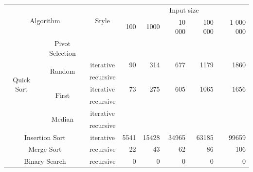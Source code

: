 \documentclass{article}
\begin{document}
\begin{table}[]
\begin{tabular}{|cc|c|rrrrr|}
\hline
\multicolumn{2}{|c|}{\multirow{2}{*}{Algorithm}} &
  \multirow{2}{*}{Style} &
  \multicolumn{5}{c|}{Input size} \\ \cline{4-8} 
\multicolumn{2}{|c|}{} &
   &
  \multicolumn{1}{r|}{100} &
  \multicolumn{1}{r|}{1000} &
  \multicolumn{1}{r|}{10 000} &
  \multicolumn{1}{r|}{100 000} &
  1 000 000 \\ \hline
\multicolumn{1}{|c|}{\multirow{7}{*}{Quick Sort}} &
  Pivot Selection &
   &
  \multicolumn{5}{r|}{} \\ \cline{2-8} 
\multicolumn{1}{|c|}{} &
  \multirow{2}{*}{Random} &
  iterative &
  \multicolumn{1}{r|}{90} &
  \multicolumn{1}{r|}{314} &
  \multicolumn{1}{r|}{677} &
  \multicolumn{1}{r|}{1179} &
  1860 \\ \cline{3-8} 
\multicolumn{1}{|c|}{} &
   &
  recursive &
  \multicolumn{1}{l|}{} &
  \multicolumn{1}{l|}{} &
  \multicolumn{1}{l|}{} &
  \multicolumn{1}{l|}{} &
  \multicolumn{1}{l|}{} \\ \cline{2-8} 
\multicolumn{1}{|c|}{} &
  \multirow{2}{*}{First} &
  iterative &
  \multicolumn{1}{r|}{73} &
  \multicolumn{1}{r|}{275} &
  \multicolumn{1}{r|}{605} &
  \multicolumn{1}{r|}{1065} &
  1656 \\ \cline{3-8} 
\multicolumn{1}{|c|}{} &
   &
  recursive &
  \multicolumn{1}{l|}{} &
  \multicolumn{1}{l|}{} &
  \multicolumn{1}{l|}{} &
  \multicolumn{1}{l|}{} &
  \multicolumn{1}{l|}{} \\ \cline{2-8} 
\multicolumn{1}{|c|}{} &
  \multirow{2}{*}{Median} &
  iterative &
  \multicolumn{1}{l|}{} &
  \multicolumn{1}{l|}{} &
  \multicolumn{1}{l|}{} &
  \multicolumn{1}{l|}{} &
  \multicolumn{1}{l|}{} \\ \cline{3-8} 
\multicolumn{1}{|c|}{} &
   &
  recursive &
  \multicolumn{1}{l|}{} &
  \multicolumn{1}{l|}{} &
  \multicolumn{1}{l|}{} &
  \multicolumn{1}{l|}{} &
  \multicolumn{1}{l|}{} \\ \hline
\multicolumn{2}{|c|}{Insertion Sort} &
  iterative &
  \multicolumn{1}{r|}{5541} &
  \multicolumn{1}{r|}{15428} &
  \multicolumn{1}{r|}{34965} &
  \multicolumn{1}{r|}{63185} &
  99659 \\ \hline
\multicolumn{2}{|c|}{Merge Sort} &
  recursive &
  \multicolumn{1}{r|}{22} &
  \multicolumn{1}{r|}{43} &
  \multicolumn{1}{r|}{62} &
  \multicolumn{1}{r|}{86} &
  106 \\ \hline
\multicolumn{2}{|c|}{Binary Search} &
  recursive &
  \multicolumn{1}{r|}{0} &
  \multicolumn{1}{r|}{0} &
  \multicolumn{1}{r|}{0} &
  \multicolumn{1}{r|}{0} &
  0 \\ \hline
\end{tabular}
\end{table}
\end{document}
